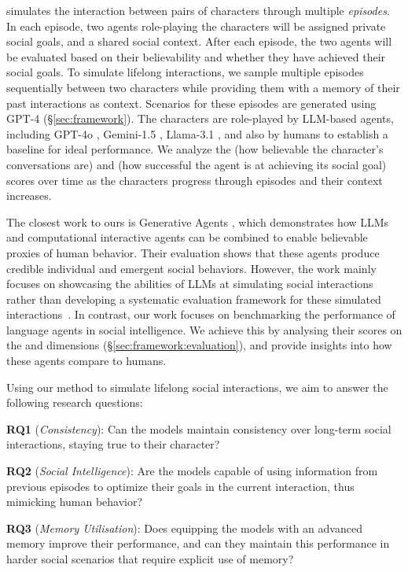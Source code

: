 \lifelongsotopia simulates the interaction between pairs of characters through multiple \emph{episodes}. In each episode, two agents role-playing the characters will be assigned private social goals, and a shared social context. After each episode, the two agents will be evaluated based on their believability and whether they have achieved their social goals. To simulate lifelong interactions, we sample multiple episodes sequentially between two characters while providing them with a memory of their past interactions as context. Scenarios for these episodes are generated using GPT-4 (\S \ref{sec:framework}). The characters are role-played by LLM-based agents, including GPT-4o \citep{openai2024gpt4}, Gemini-1.5 \citep{geminiteam2023gemini}, Llama-3.1 \citep{dubey2024llama3herdmodels}, and also by humans to establish a baseline for ideal performance. We analyze the \believabilityFull (how believable the character's conversations are) and \goalcompletionFull (how successful the agent is at achieving its social goal) scores over time as the characters progress through episodes and their context increases.

The closest work to ours is Generative Agents \citep{park2023generative}, which demonstrates how LLMs and computational interactive agents can be combined to enable believable proxies of human behavior. Their evaluation shows that these agents produce credible individual and emergent social behaviors. However, the work mainly focuses on showcasing the abilities of LLMs at simulating social interactions rather than developing a systematic evaluation framework for these simulated interactions~\citep{zhou2023sotopia}. In contrast, our work focuses on benchmarking the performance of language agents in social intelligence. We achieve this by analysing their scores on the \believability and \goalcompletion dimensions (\S \ref{sec:framework:evaluation}), and provide insights into how these agents compare to humans.

Using our method to simulate lifelong social interactions, we aim to answer the following research questions:

\textbf{RQ1} (\emph{Consistency}): Can the models maintain consistency over long-term social interactions, staying true to their character?

\textbf{RQ2} (\emph{Social Intelligence}): Are the models capable of using information from previous episodes to optimize their goals in the current interaction, thus mimicking human behavior?

\textbf{RQ3} (\emph{Memory Utilisation}): Does equipping the models with an advanced memory improve their performance, and can they maintain this performance in harder social scenarios that require explicit use of memory?

